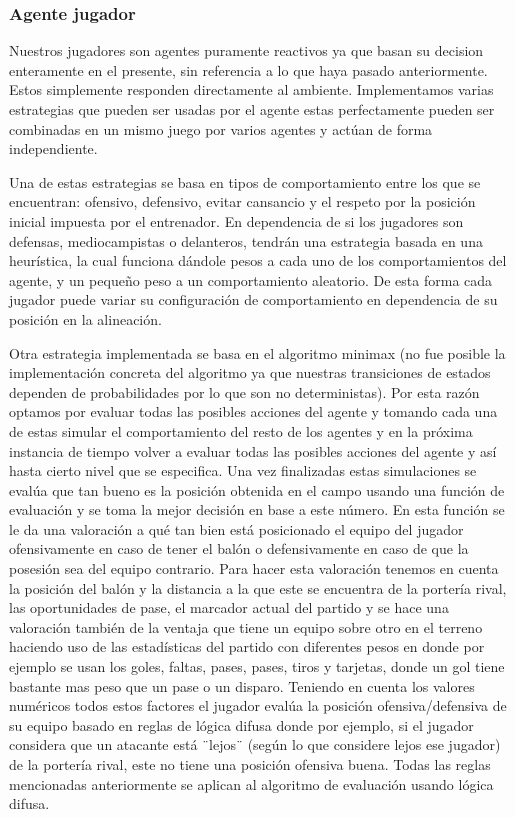 \documentclass{article}
\begin{document}
\subsubsection{Agente jugador}
Nuestros jugadores son agentes puramente reactivos ya que basan su decision enteramente en el presente, sin referencia 
a lo que haya pasado anteriormente. Estos simplemente responden directamente al ambiente. Implementamos varias 
estrategias que pueden ser usadas por el agente estas perfectamente pueden ser combinadas en un mismo juego por 
varios agentes y actúan de forma independiente.

Una de estas estrategias se basa en tipos de comportamiento entre los que se encuentran: ofensivo, defensivo, evitar 
cansancio y el respeto por la posición inicial impuesta por el entrenador. En dependencia de si los jugadores son 
defensas, mediocampistas o delanteros, tendrán una estrategia basada en una heurística, la cual funciona dándole 
pesos a cada uno de los comportamientos del agente, y un pequeño peso a un comportamiento aleatorio. De esta forma 
cada jugador puede variar su configuración de comportamiento en dependencia de su posición en la alineación.

Otra estrategia implementada se basa en el algoritmo minimax (no fue posible la implementación concreta del algoritmo 
ya que nuestras transiciones de estados dependen de probabilidades por lo que son no deterministas). Por esta razón 
optamos por evaluar todas las posibles acciones del agente y tomando cada una de estas simular el comportamiento del 
resto de los agentes y en la próxima instancia de tiempo volver a evaluar todas las posibles acciones del agente y así 
hasta cierto nivel que se especifica. Una vez finalizadas estas simulaciones se evalúa que tan bueno es la posición 
obtenida en el campo usando una función de evaluación y se toma la mejor decisión en base a este número. En esta 
función se le da una valoración a qué tan bien está posicionado el equipo del jugador ofensivamente en caso de tener 
el balón o defensivamente en caso de que la posesión sea del equipo contrario. Para hacer esta valoración tenemos en 
cuenta la posición del balón y la distancia a la que este se encuentra de la portería rival, las oportunidades de 
pase, el marcador actual del partido y se hace una valoración también de la ventaja que tiene un equipo sobre otro 
en el terreno haciendo uso de las estadísticas del partido con diferentes pesos en donde por ejemplo se usan los 
goles, faltas, pases, pases, tiros y tarjetas, donde un gol tiene bastante mas peso que un pase  o un disparo. 
Teniendo en cuenta los valores numéricos todos estos factores el jugador evalúa la posición ofensiva/defensiva de 
su equipo basado en reglas de lógica difusa donde por ejemplo, si el jugador considera que un atacante está ¨lejos¨ 
(según lo que considere lejos ese jugador) de la portería rival, este no tiene una posición ofensiva buena.
Todas las reglas mencionadas anteriormente se aplican al algoritmo de evaluación usando lógica difusa.
\end{document}
